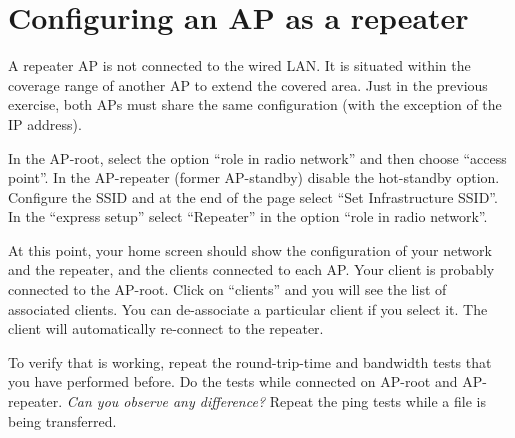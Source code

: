 \section{Configuring an AP as a repeater}

A repeater AP is not connected to the wired LAN.
It is situated within the coverage range of another AP to extend the covered area.
Just in the previous exercise, both APs must share the same configuration (with the exception of the IP address).

In the AP-root, select the option ``role in radio network'' and then choose ``access point''.
In the AP-repeater (former AP-standby) disable the hot-standby option.
Configure the SSID and at the end of the page select ``Set Infrastructure SSID''.
In the ``express setup'' select ``Repeater'' in the option ``role in radio network''.

At this point, your home screen should show the configuration of your network and the repeater, and the clients connected to each AP.
Your client is probably connected to the AP-root. 
Click on ``clients'' and you will see the list of associated clients.
You can de-associate a particular client if you select it.
The client will automatically re-connect to the repeater.

To verify that is working, repeat the round-trip-time and bandwidth tests that you have performed before.
Do the tests while connected on AP-root and AP-repeater.
\emph{Can you observe any difference?}
Repeat the ping tests while a file is being transferred.





